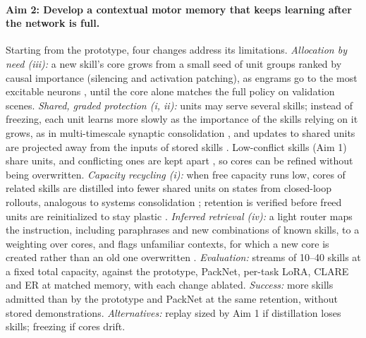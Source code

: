 \documentclass[11pt]{article}
\begin{document}
\paragraph{Aim 2: Develop a contextual motor memory that keeps learning after the network is full.} Starting from the
prototype, four changes address its limitations. \emph{Allocation by need (iii):} a new skill's core
grows from a small seed of unit groups ranked by causal importance (silencing and activation patching), as
engrams go to the most excitable neurons \citep{josselyn2020}, until the core alone matches the
full policy on validation scenes. \emph{Shared, graded protection (i, ii):} units may serve several skills; instead of
freezing, each unit learns more slowly as the importance of the skills relying on it grows, as in multi-timescale
synaptic consolidation \citep{benna2016}, and updates to shared units are projected away from the inputs of stored
skills \citep{saha2021gpm}. Low-conflict skills (Aim 1) share units, and conflicting ones are kept apart
\citep{cai2016}, so cores can be refined without being overwritten. \emph{Capacity recycling (i):} when free capacity
runs low, cores of related skills are distilled into fewer shared units on states from closed-loop rollouts, analogous to
systems consolidation \citep{mcclelland1995}; retention is verified before freed units are reinitialized to
stay plastic \citep{dohare2024}. \emph{Inferred retrieval (iv):} a light router maps the instruction, including
paraphrases and new combinations of known skills, to a weighting over cores, and flags unfamiliar contexts, for which a
new core is created rather than an old one overwritten \citep{heald2021}. \emph{Evaluation:} streams of 10--40 skills at
a fixed total capacity, against the prototype, PackNet, per-task LoRA, CLARE and ER at matched memory, with each change
ablated. \emph{Success:} more skills admitted than by the prototype and PackNet at the same retention, without stored
demonstrations. \emph{Alternatives:} replay sized by Aim 1 if distillation loses skills; freezing if cores drift.
\end{document}

